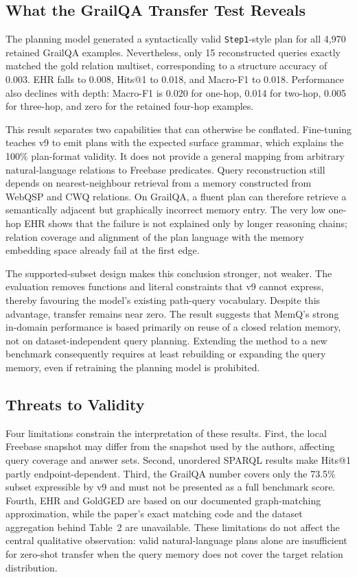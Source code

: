 \subsection{What the GrailQA Transfer Test Reveals}
\label{app:additional-grailqa-analysis}

The planning model generated a syntactically valid \texttt{Step1}-style plan
for all 4,970 retained GrailQA examples. Nevertheless, only 15 reconstructed
queries exactly matched the gold relation multiset, corresponding to a
structure accuracy of 0.003. EHR falls to 0.008, Hits@1 to 0.018, and Macro-F1
to 0.018. Performance also declines with depth: Macro-F1 is 0.020 for one-hop,
0.014 for two-hop, 0.005 for three-hop, and zero for the retained four-hop
examples.

This result separates two capabilities that can otherwise be conflated.
Fine-tuning teaches v9 to emit plans with the expected surface grammar, which
explains the 100\% plan-format validity. It does not provide a general mapping
from arbitrary natural-language relations to Freebase predicates. Query
reconstruction still depends on nearest-neighbour retrieval from a memory
constructed from WebQSP and CWQ relations. On GrailQA, a fluent plan can
therefore retrieve a semantically adjacent but graphically incorrect memory
entry. The very low one-hop EHR shows that the failure is not explained only by
longer reasoning chains; relation coverage and alignment of the plan language
with the memory embedding space already fail at the first edge.

The supported-subset design makes this conclusion stronger, not weaker. The
evaluation removes functions and literal constraints that v9 cannot express,
thereby favouring the model's existing path-query vocabulary. Despite this
advantage, transfer remains near zero. The result suggests that MemQ's strong
in-domain performance is based primarily on reuse of a closed relation memory,
not on dataset-independent query planning. Extending the method to a new
benchmark consequently requires at least rebuilding or expanding the query
memory, even if retraining the planning model is prohibited.

\subsection{Threats to Validity}
\label{app:additional-validity}

Four limitations constrain the interpretation of these results. First, the
local Freebase snapshot may differ from the snapshot used by the authors,
affecting query coverage and answer sets. Second, unordered SPARQL results make
Hits@1 partly endpoint-dependent. Third, the GrailQA number covers only the
73.5\% subset expressible by v9 and must not be presented as a full benchmark
score. Fourth, EHR and GoldGED are based on our documented graph-matching
approximation, while the paper's exact matching code and the dataset
aggregation behind Table~2 are unavailable. These limitations do not affect
the central qualitative observation: valid natural-language plans alone are
insufficient for zero-shot transfer when the query memory does not cover the
target relation distribution.
